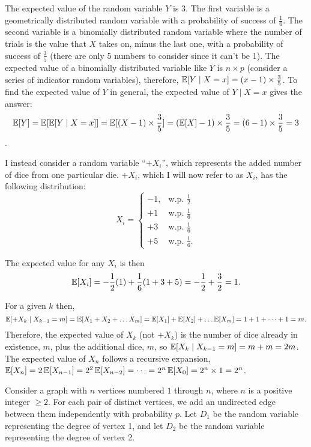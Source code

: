 \documentclass[11pt]{article}
\begin{document}
\begin{solution}
	
\begin{Parts}
	
\Part The expected value of the random variable $Y$ is 3. The first variable is
a geometrically distributed random variable with a probability of success of 
$\frac{1}{6}$. The second variable is a binomially distributed random variable
where the number of trials is the value that $X$ takes on, minus the last one, 
with a probability of success of $\frac{3}{5}$ (there are only 5 numbers to 
consider since it can't be 1). The expected value of a binomially distributed
variable like $Y$ is $n \times p$ (consider a series of indicator random 
variables), therefore, $\operatorname{\mathbb{E}}[Y \mid X = x] = (x-1) \times \frac{3}{5}$. To find
the expected value of $Y$ in general, the expected value of $Y \mid X = x$ gives
the answer: $$\operatorname{\mathbb{E}}[Y] = \operatorname{\mathbb{E}}[\operatorname{\mathbb{E}}[Y \mid X =x ]] = \operatorname{\mathbb{E}}[(X-1) \times \frac{3}{5}] = (\operatorname{\mathbb{E}}[X]
- 1) \times \frac{3}{5} = (6 -1 ) \times \frac{3}{5} = 3$$.

\Part I instead consider a random variable ``$+X_i$'', which represents the 
added number of dice from one particular die. $+X_i$, which I will now refer to
as $X_i$, has the following distribution: 
\[
X_i =
\begin{cases}
  -1, & \text{w.p. } \frac{1}{2} \\
  +1 & \text{w.p. } \frac{1}{6} \\
  +3 & \text{w.p. } \frac{1}{6} \\
  +5 & \text{w.p. } \frac{1}{6}.
\end{cases}
\]

The expected value for any $X_i$ is then $$\operatorname{\mathbb{E}}[X_i] = - \frac{1}{2}(1) + 
\frac{1}{6}(1+3+5)= - \frac{1}{2} + \frac{3}{2} = 1.$$

For a given $k$ then, $$\operatorname{\mathbb{E}}[+X_k \mid X_{k-1} = m] = \operatorname{\mathbb{E}}[X_1 + X_2 + \dots X_m] =
\operatorname{\mathbb{E}}[X_1] + \operatorname{\mathbb{E}}[X_2] + \dots \operatorname{\mathbb{E}}[X_m] =  1 + 1 + \dots + 1 = m.$$ Therefore, the
expected value of $X_k$ (not $+X_k$) is the number of dice already in existence,
$m$, plus the additional dice, $m$, so $\operatorname{\mathbb{E}}[X_k \mid X_{k-1} = m] = m + m = 2m$. 
The expected value of $X_n$ follows a recursive expansion, $\operatorname{\mathbb{E}}[X_n] = 2 \operatorname{\mathbb{E}}[X_{n-1}]
=  2^2 \operatorname{\mathbb{E}}[X_{n-2}] = \dots = 2^n \operatorname{\mathbb{E}}[X_0] = 2^n \times 1 = 2^n$.

\end{Parts}

\end{solution}

Consider a graph with $n$ vertices numbered $1$ through $n$, where $n$ is a positive integer $\ge 2$. For each pair of distinct vertices, we add an undirected edge between them independently with probability $p$. Let $D_1$ be the random variable representing the degree of vertex 1, and let $D_2$ be the random variable representing the degree of vertex 2. 
\end{document}
